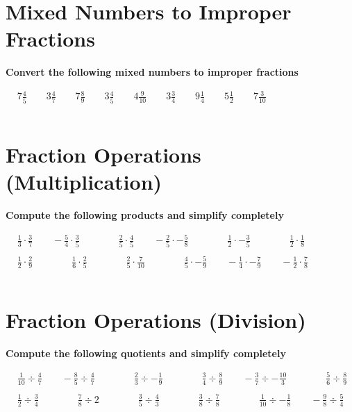 \documentclass{article}
\begin{document}
\section{Mixed Numbers to Improper Fractions}
\textbf{Convert the following mixed numbers to improper fractions}
\bigskip

\(\begin{aligned}
	&7\frac{4}{5} \qquad 3\frac{4}{7} \qquad 7\frac{8}{9} \qquad 3\frac{4}{5} \qquad 4\frac{9}{10} \qquad 3\frac{3}{4} \qquad 9\frac{1}{4} \qquad 5\frac{1}{2} \qquad 7\frac{3}{10}\\\\
\end{aligned}\)


\section{Fraction Operations (Multiplication)}
\textbf{Compute the following products and simplify completely}
\bigskip

\(\begin{aligned}
	&\frac{1}{3} \cdot \frac{3}{7} \qquad -\frac{5}{4}\cdot \frac{3}{5} \qquad\qquad \frac{2}{5} \cdot \frac{4}{5} \qquad -\frac{2}{5} \cdot -\frac{5}{8} \qquad\qquad \frac{1}{2} \cdot -\frac{3}{5} \qquad\qquad \frac{1}{2} \cdot \frac{1}{8} \\\\
	&\frac{1}{2} \cdot \frac{2}{9} \qquad\qquad \frac{1}{6}\cdot \frac{2}{5} \qquad\qquad \frac{2}{5} \cdot \frac{7}{10} \qquad\qquad \frac{4}{5} \cdot -\frac{5}{9} \qquad -\frac{1}{4} \cdot -\frac{7}{9} \qquad -\frac{1}{2} \cdot \frac{7}{8} \\\\
\end{aligned}\)


\section{Fraction Operations (Division)}
\textbf{Compute the following quotients and simplify completely}
\bigskip

\(\begin{aligned}
	&\frac{1}{10} \div \frac{4}{7} \qquad -\frac{8}{5}\div \frac{4}{7} \qquad\qquad \frac{2}{3} \div -\frac{1}{9} \qquad\qquad \frac{3}{4} \div \frac{8}{9} \qquad -\frac{3}{7} \div -\frac{10}{3} \qquad\qquad \frac{5}{6} \div \frac{8}{9} \\\\
	&\frac{1}{2} \div \frac{3}{4} \qquad\qquad \frac{7}{8}\div 2 \qquad\qquad \frac{3}{5} \div \frac{4}{3} \qquad\qquad \frac{3}{8} \div \frac{7}{8} \qquad\qquad \frac{1}{10} \div -\frac{1}{8} \qquad -\frac{9}{8} \div \frac{5}{4} \\\\
\end{aligned}\)
\end{document}
